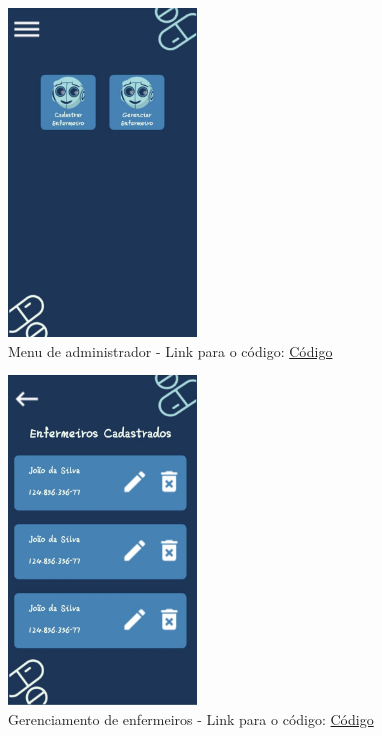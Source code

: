 \begin{apendicesenv}
\begin{figure}[H]
    \centering
    \includegraphics[width=5cm]{figuras/Software_Telas_Frontend/front_AdminMenu.jpg}
    \caption{Menu de administrador - Link para o código: \href{https://github.com/PillWatcher/pillwatcher-dpf-service/blob/dev/components/adminMenu.js}{Código}}
    \label{fig:admin_menu}
\end{figure}

\begin{figure}[H]
    \centering
    \includegraphics[width=5cm]{figuras/Software_Telas_Frontend/front_GerenciarEnfermeirosMenu.jpg}
    \caption{Gerenciamento de enfermeiros - Link para o código: \href{https://github.com/PillWatcher/pillwatcher-dpf-service/blob/dev/components/gerenciarEnfermeirosMenu.js}{Código}}
    \label{fig:gerenciamento_enfermeiros}
\end{figure}


\end{apendicesenv}
